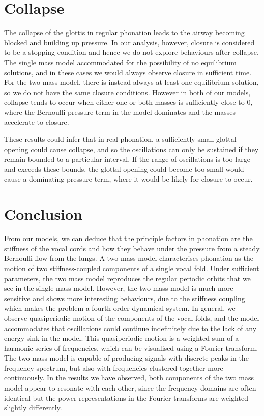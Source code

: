 \documentclass{report}
\begin{document}
\section{Collapse}

The collapse of the glottis in regular phonation leads to the airway becoming blocked and building up pressure.
In our analysis, however, closure is considered to be a stopping condition and hence we do not explore behaviours after collapse.
The single mass model accommodated for the possibility of no equilibrium solutions,
and in these cases we would always observe closure in sufficient time.
For the two mass model, there is instead always at least one equilibrium solution,
so we do not have the same closure conditions.
However in both of our models,
collapse tends to occur when either one or both masses is sufficiently close to $0$,
where the Bernoulli pressure term in the model dominates and the masses accelerate to closure.

These results could infer that in real phonation,
a sufficiently small glottal opening could cause collapse,
and so the oscillations can only be sustained if they remain bounded to a particular interval.
If the range of oscillations is too large and exceeds these bounds,
the glottal opening could become too small would cause a dominating pressure term,
where it would be likely for closure to occur.

\section{Conclusion}

From our models,
we can deduce that the principle factors in phonation are the stiffness of the vocal cords and how they behave under the pressure from a steady Bernoulli flow from the lungs.
A two mass model characterises phonation as the motion of two stiffness-coupled components of a single vocal fold.
Under sufficient parameters, the two mass model reproduces the regular periodic orbits that we see in the single mass model.
However, the two mass model is much more sensitive and shows more interesting behaviours,
due to the stiffness coupling which makes the problem a fourth order dynamical system.
In general, we observe quasiperiodic motion of the components of the vocal folds,
and the model accommodates that oscillations could continue indefinitely due to the lack of any energy sink in the model.
This quasiperiodic motion is a weighted sum of a harmonic series of frequencies,
which can be visualised using a Fourier transform.
The two mass model is capable of producing signals with discrete peaks in the frequency spectrum,
but also with frequencies clustered together more continuously.
In the results we have observed,
both components of the two mass model appear to resonate with each other,
since the frequency domains are often identical but the power representations in the Fourier transforms are weighted slightly differently.
\end{document}
